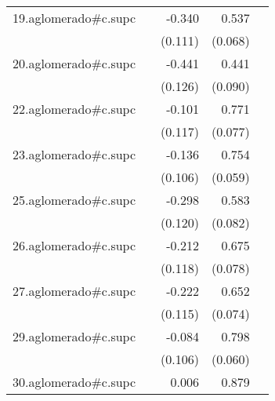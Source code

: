 {\begin{longtable}{l*{4}{D{.}{.}{-1}}}
\addlinespace
19.aglomerado#c.supc&                     &      -0.340\sym{**} &       0.537\sym{***}&                     \\
            &                     &     (0.111)         &     (0.068)         &                     \\
\addlinespace
20.aglomerado#c.supc&                     &      -0.441\sym{***}&       0.441\sym{***}&                     \\
            &                     &     (0.126)         &     (0.090)         &                     \\
\addlinespace
22.aglomerado#c.supc&                     &      -0.101         &       0.771\sym{***}&                     \\
            &                     &     (0.117)         &     (0.077)         &                     \\
\addlinespace
23.aglomerado#c.supc&                     &      -0.136         &       0.754\sym{***}&                     \\
            &                     &     (0.106)         &     (0.059)         &                     \\
\addlinespace
25.aglomerado#c.supc&                     &      -0.298\sym{*}  &       0.583\sym{***}&                     \\
            &                     &     (0.120)         &     (0.082)         &                     \\
\addlinespace
26.aglomerado#c.supc&                     &      -0.212         &       0.675\sym{***}&                     \\
            &                     &     (0.118)         &     (0.078)         &                     \\
\addlinespace
27.aglomerado#c.supc&                     &      -0.222         &       0.652\sym{***}&                     \\
            &                     &     (0.115)         &     (0.074)         &                     \\
\addlinespace
29.aglomerado#c.supc&                     &      -0.084         &       0.798\sym{***}&                     \\
            &                     &     (0.106)         &     (0.060)         &                     \\
\addlinespace
30.aglomerado#c.supc&                     &       0.006         &       0.879\sym{***}&                     \\

\end{longtable}}
